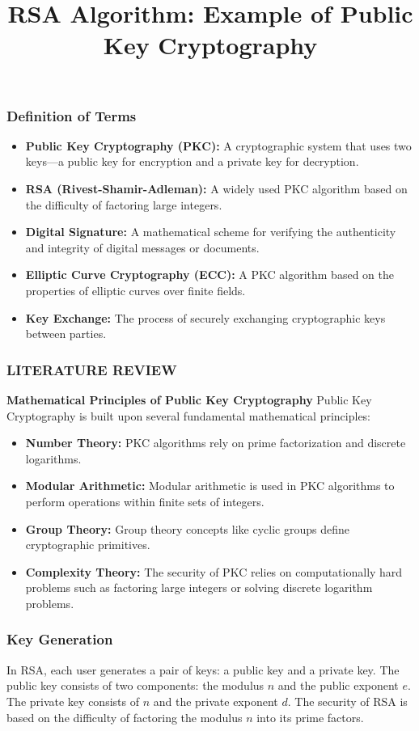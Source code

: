 \documentclass{beamer}
\begin{document}
\begin{frame}
\frametitle{Definition of Terms}
\begin{itemize}
    \item \textbf{Public Key Cryptography (PKC):} A cryptographic system that uses two keys—a public key for encryption and a private key for decryption.
    \item \textbf{RSA (Rivest-Shamir-Adleman):} A widely used PKC algorithm based on the difficulty of factoring large integers.
    \item \textbf{Digital Signature:} A mathematical scheme for verifying the authenticity and integrity of digital messages or documents.
    \item \textbf{Elliptic Curve Cryptography (ECC):} A PKC algorithm based on the properties of elliptic curves over finite fields.
    \item \textbf{Key Exchange:} The process of securely exchanging cryptographic keys between parties.
\end{itemize}
\end{frame}







\begin{frame}
\frametitle{LITERATURE REVIEW}
\textbf{Mathematical Principles of Public Key Cryptography}
Public Key Cryptography is built upon several fundamental mathematical principles:
\begin{itemize}
    \item \textbf{Number Theory:} PKC algorithms rely on prime factorization and discrete logarithms.
    \item \textbf{Modular Arithmetic:} Modular arithmetic is used in PKC algorithms to perform operations within finite sets of integers.
    \item \textbf{Group Theory:} Group theory concepts like cyclic groups define cryptographic primitives.
    \item \textbf{Complexity Theory:} The security of PKC relies on computationally hard problems such as factoring large integers or solving discrete logarithm problems.
\end{itemize}
\end{frame}

\begin{frame}
\frametitle{Key Generation}
\title{RSA Algorithm: Example of Public Key Cryptography}
In RSA, each user generates a pair of keys: a public key and a private key. The public key consists of two components: the modulus \(n\) and the public exponent \(e\). The private key consists of \(n\) and the private exponent \(d\). The security of RSA is based on the difficulty of factoring the modulus \(n\) into its prime factors.
\end{frame}
\end{document}
